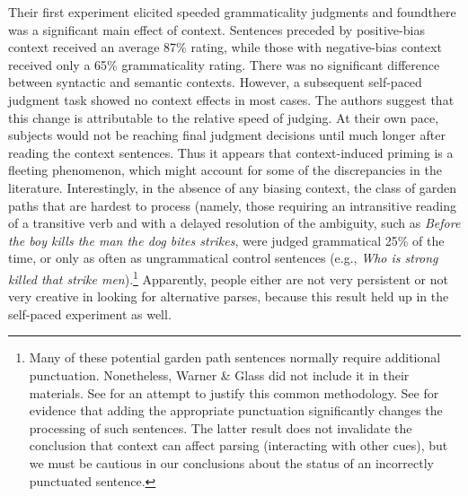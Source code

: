 \noindent
Their first experiment elicited speeded grammaticality judgments and found\linebreak there was a significant main effect of context. Sentences preceded by positive-bias context received an average 87\% rating, while those with negative-bias context received only a 65\% grammaticality rating. There was no significant  difference between syntactic and semantic contexts. However, a subsequent self-paced judgment task showed no context effects in most cases. The authors suggest that this change is attributable to the relative speed of judging. At their own pace, subjects would not be reaching final judgment decisions until much longer after reading the context sentences. Thus it appears that context-induced priming is a fleeting phenomenon, which might account for some of the discrepancies in the literature. Interestingly, in the absence of any biasing context, the class of garden paths that are hardest to process (namely, those requiring an intransitive reading of a transitive verb and with a delayed resolution of the ambiguity, such as \textit{Before the boy kills the man the dog bites strikes}, were judged grammatical 25\% of the time, or only as often as ungrammatical control sentences (e.g., \textit{Who is strong killed that strike men}).\footnote{Many of these potential garden path sentences normally require additional punctuation. Nonetheless, Warner \& Glass did not include it in their materials. See \citet{FrazierEtAl1982} for an attempt to justify this common methodology. See \citet{MitchellEtAl1985} for evidence that adding the appropriate punctuation significantly changes the processing of such sentences. The latter result does not invalidate the conclusion that context can affect parsing (interacting with other cues), but we must be cautious in our conclusions about the status of an incorrectly punctuated sentence.
}
 Apparently, people either are not very persistent or not very creative in looking for alternative parses, because this result held up in the self-paced experiment as well.

